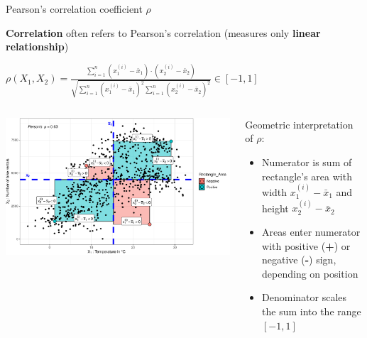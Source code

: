 \documentclass[10pt,compress,t,notes=noshow, xcolor=table]{beamer}
\begin{document}
\begin{frame}{Pearson's correlation coefficient $\rho$}

\textbf{Correlation} often refers to Pearson's correlation (measures only \textbf{linear relationship}) %
\smallskip



\centerline{$\rho(X_1, X_2) = \tfrac{\sum_{i=1}^{n}{(x_1^{(i)}-\bar{x}_1) \cdot (x_2^{(i)}-\bar{x}_2)}}{\sqrt{\sum_{i=1}^{n}{(x_1^{(i)}-\bar{x}_1)^2 \sum_{i=1}^{n}{(x_2^{(i)}-\bar{x}_2)^2 }}}} \in [-1, 1]$}

\bigskip

\begin{columns}[T, totalwidth=\textwidth]
\begin{column}{0.55\linewidth}
\includegraphics[width = \textwidth]{figure/pearson_cor}
\end{column}
\begin{column}{0.45\linewidth}

Geometric interpretation of $\rho$:
\begin{itemize}
    \item Numerator is sum of rectangle's area with width $x_1^{(i)}-\bar{x}_1$ and height $x_2^{(i)}-\bar{x}_2$
    \item Areas enter numerator with positive (\textbf{+}) or negative (\textbf{-}) sign, depending on position
    \item Denominator scales the sum into the range $[-1, 1]$
\end{itemize}
\end{column}
\end{columns}


\end{frame}
\end{document}
